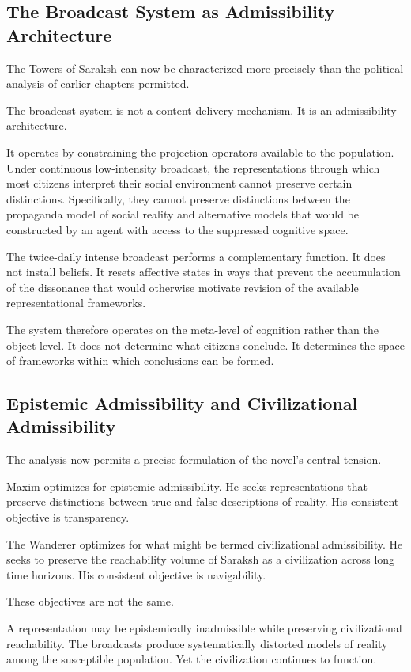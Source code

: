 \documentclass[12pt, a4paper]{article}
\theoremstyle{plain}
\theoremstyle{definition}
\theoremstyle{remark}
\begin{document}
\subsection{The Broadcast System as Admissibility Architecture}

The Towers of Saraksh can now be characterized
more precisely than the political analysis of
earlier chapters permitted.

The broadcast system is not a content delivery
mechanism. It is an admissibility architecture.

It operates by constraining the projection
operators available to the population. Under
continuous low-intensity broadcast, the
representations through which most citizens
interpret their social environment cannot preserve
certain distinctions. Specifically, they cannot
preserve distinctions between the propaganda model
of social reality and alternative models that
would be constructed by an agent with access to
the suppressed cognitive space.

The twice-daily intense broadcast performs a
complementary function. It does not install
beliefs. It resets affective states in ways that
prevent the accumulation of the dissonance that
would otherwise motivate revision of the available
representational frameworks.

The system therefore operates on the meta-level
of cognition rather than the object level. It
does not determine what citizens conclude. It
determines the space of frameworks within which
conclusions can be formed.

\subsection{Epistemic Admissibility and Civilizational Admissibility}

The analysis now permits a precise formulation
of the novel's central tension.

Maxim optimizes for epistemic admissibility.
He seeks representations that preserve distinctions
between true and false descriptions of reality.
His consistent objective is transparency.

The Wanderer optimizes for what might be termed
civilizational admissibility. He seeks to preserve
the reachability volume of Saraksh as a
civilization across long time horizons. His
consistent objective is navigability.

These objectives are not the same.

A representation may be epistemically inadmissible
while preserving civilizational reachability. The
broadcasts produce systematically distorted models
of reality among the susceptible population. Yet
the civilization continues to function.
\end{document}
